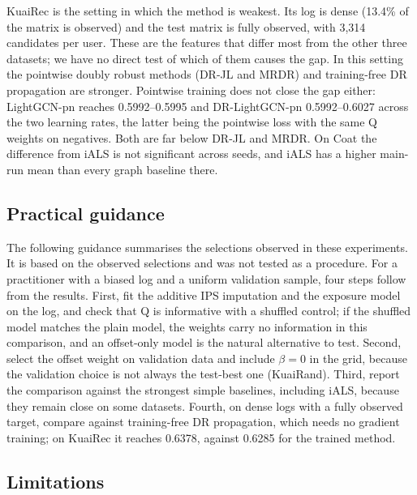 KuaiRec is the setting in which the method is weakest. Its log is dense (13.4\% of the matrix is observed) and the
test matrix is fully observed, with 3{,}314 candidates per user. These are the features that differ most from the
other three datasets; we have no direct test of which of them causes the gap. In this setting the pointwise doubly robust
methods (DR-JL and MRDR) and training-free DR propagation are stronger. Pointwise training does not close the gap
either: LightGCN-pn reaches 0.5992--0.5995 and DR-LightGCN-pn 0.5992--0.6027 across the two learning rates, the
latter being the pointwise loss with the same Q weights on negatives. Both are far below DR-JL and MRDR.
On Coat the difference from iALS is not significant across seeds, and iALS has a higher main-run mean than every graph baseline there.

\subsection{Practical guidance}\label{sec:practical}

The following guidance summarises the selections observed in these experiments. It is based on the observed
selections and was not tested as a procedure. For a practitioner with a biased log and a uniform validation sample,
four steps follow from the results. First,
fit the additive IPS imputation and the exposure model on the log, and check that Q is informative with a
shuffled control; if the shuffled model matches the plain model, the weights carry no information in this comparison, and an offset-only model is the natural alternative to test. Second, select the offset weight on validation data and include $\beta=0$ in the grid, because the
validation choice is not always the test-best one (KuaiRand). Third, report the comparison against the strongest
simple baselines, including iALS, because they remain close on some datasets. Fourth, on dense logs with a fully
observed target, compare against training-free DR propagation, which needs no gradient training; on KuaiRec it
reaches 0.6378, against 0.6285 for the trained method.

\subsection{Limitations}\label{sec:limitations}

